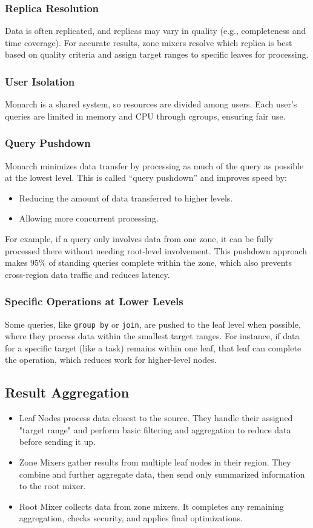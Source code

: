 \subsubsection{Replica Resolution}
Data is often replicated, and replicas may vary in quality (e.g., completeness and time coverage). For accurate results, zone mixers resolve which replica is best based on quality criteria and assign target ranges to specific leaves for processing.

\subsubsection{User Isolation}
Monarch is a shared system, so resources are divided among users. Each user’s queries are limited in memory and CPU through cgroups, ensuring fair use.

\subsubsection{Query Pushdown}
Monarch minimizes data transfer by processing as much of the query as possible at the lowest level. This is called “query pushdown” and improves speed by:
\begin{itemize}
    \item Reducing the amount of data transferred to higher levels.
    \item Allowing more concurrent processing.
\end{itemize}
For example, if a query only involves data from one zone, it can be fully processed there without needing root-level involvement. This pushdown approach makes 95\% of standing queries complete within the zone, which also prevents cross-region data traffic and reduces latency.

\subsubsection{Specific Operations at Lower Levels}
Some queries, like \texttt{group by} or \texttt{join}, are pushed to the leaf level when possible, where they process data within the smallest target ranges. For instance, if data for a specific target (like a task) remains within one leaf, that leaf can complete the operation, which reduces work for higher-level nodes.

\subsection{Result Aggregation}
\begin{itemize}
    \item Leaf Nodes process data closest to the source. They handle their assigned "target range" and perform basic filtering and aggregation to reduce data before sending it up.
    \item Zone Mixers gather results from multiple leaf nodes in their region. They combine and further aggregate data, then send only summarized information to the root mixer.
    \item Root Mixer collects data from zone mixers. It completes any remaining aggregation, checks security, and applies final optimizations.
\end{itemize}